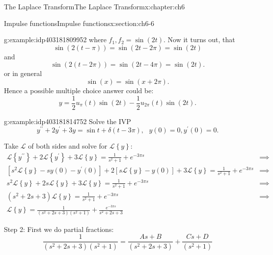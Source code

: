\documentclass[oneside,10pt,]{book}
\numberwithin{equation}{section}
\numberwithin{equation}{section}
\newcommand{\amp}{&}
\begin{document}
\begin{chapterptx}{The Laplace Transform}{}{The Laplace Transform}{}{}{x:chapter:ch6}
\begin{sectionptx}{Impulse functions}{}{Impulse functions}{}{}{x:section:ch6-6}
\begin{example}{}{g:example:idp403181809952}
where \(f_{1},f_{2}=\sin(2t)\). Now it turns out, that%
\begin{equation*}
\sin\left(2\left(t-\pi\right)\right)=\sin\left(2t-2\pi\right)=\sin(2t)
\end{equation*}
and%
\begin{equation*}
\sin\left(2\left(t-2\pi\right)\right)=\sin\left(2t-4\pi\right)=\sin(2t).
\end{equation*}
or in general%
\begin{equation*}
\sin\left(x\right)=\sin\left(x+2\pi\right).
\end{equation*}
Hence a possible multiple choice answer could be:%
\begin{equation*}
y=\frac{1}{2}u_{\pi}(t)\sin\left(2t\right)-\frac{1}{2}u_{2\pi}(t)\sin\left(2t\right).
\end{equation*}
%
\end{example}
\begin{example}{}{g:example:idp403181814752}%
Solve the IVP%
\begin{equation*}
y^{\prime\prime}+2y^{\prime}+3y=\sin t+\delta\left(t-3\pi\right),\,\,\,\,y(0)=0,y^{\prime}(0)=0.
\end{equation*}
%
\par
Take \(\mathcal{L}\) of both sides and solve for \(\mathcal{L}\left\{ y\right\} \):%
\begin{align*}
\mathcal{L}\left\{ y^{\prime\prime}\right\} +2\mathcal{L}\left\{ y^{\prime}\right\} +3\mathcal{L}\left\{ y\right\} =\frac{1}{s^{2}+1}+e^{-3\pi s} \amp \implies\\
\left[s^{2}\mathcal{L}\left\{ y\right\} -sy(0)-y^{\prime}(0)\right]+2\left[s\mathcal{L}\left\{ y\right\} -y(0)\right]+3\mathcal{L}\left\{ y\right\} =\frac{1}{s^{2}+1}+e^{-3\pi s} \amp \implies\\
s^{2}\mathcal{L}\left\{ y\right\} +2s\mathcal{L}\left\{ y\right\} +3\mathcal{L}\left\{ y\right\} =\frac{1}{s^{2}+1}+e^{-3\pi s} \amp \implies\\
\left(s^{2}+2s+3\right)\mathcal{L}\left\{ y\right\} =\frac{1}{s^{2}+1}+e^{-3\pi s} \amp \implies\\
\mathcal{L}\left\{ y\right\} =\frac{1}{\left(s^{2}+2s+3\right)\left(s^{2}+1\right)}+\frac{e^{-3\pi s}}{s^{2}+2s+3}
\end{align*}
%
\par
Step 2: First we do partial fractions:%
\begin{equation*}
\frac{1}{\left(s^{2}+2s+3\right)\left(s^{2}+1\right)}=\frac{As+B}{\left(s^{2}+2s+3\right)}+\frac{Cs+D}{\left(s^{2}+1\right)}

\end{equation*}
\end{example}
\end{sectionptx}
\end{chapterptx}
\end{document}
